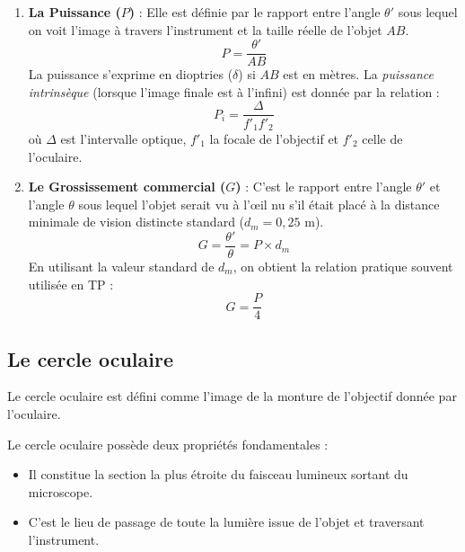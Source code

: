 \begin{enumerate}
    \item \textbf{La Puissance ($P$)} : 
    Elle est définie par le rapport entre l'angle $\theta'$ 
    sous lequel on voit l'image à travers l'instrument et la taille réelle de l'objet $AB$.
    \begin{equation}
        P = \frac{\theta'}{AB}
    \end{equation}
    La puissance s'exprime en dioptries ($\delta$) 
    si $AB$ est en mètres. 
    La \textit{puissance intrinsèque} (lorsque l'image finale est à l'infini) 
    est donnée par la relation :
    \begin{equation}
        P_{i} = \frac{\Delta}{f'_1 f'_2}
    \end{equation}
    où $\Delta$ est l'intervalle optique, $f'_1$ la focale de l'objectif et $f'_2$ celle de l'oculaire.

    \item \textbf{Le Grossissement commercial ($G$)} : C'est le rapport entre l'angle $\theta'$ 
    et l'angle $\theta$ sous lequel l'objet serait vu à l'œil nu 
    s'il était placé à la distance minimale de vision distincte standard ($d_m = 0,25$ m).
    \begin{equation}
        G = \frac{\theta'}{\theta} = P \times d_m
    \end{equation}
    En utilisant la valeur standard de $d_m$, on obtient la relation pratique souvent utilisée en TP :
    \begin{equation}
        G = \frac{P}{4}
    \end{equation}
\end{enumerate}

\subsection{Le cercle oculaire}

Le cercle oculaire est défini comme l'image de la monture de l'objectif 
donnée par l'oculaire. 

Le cercle oculaire possède deux propriétés fondamentales :
\begin{itemize}
    \item Il constitue la section la plus étroite du faisceau lumineux sortant du microscope.
    \item C'est le lieu de passage de toute la lumière issue de l'objet et traversant l'instrument.
\end{itemize}

